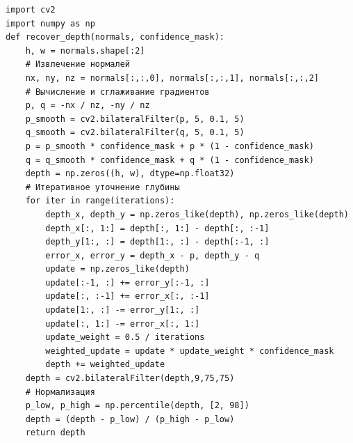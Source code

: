 \begin{center}
    \begin{lstlisting}[label=lst:depth_integration,caption=Восстановление карты глубин по нормалям]
import cv2
import numpy as np
def recover_depth(normals, confidence_mask):
    h, w = normals.shape[:2]
    # Извлечение нормалей
    nx, ny, nz = normals[:,:,0], normals[:,:,1], normals[:,:,2]
    # Вычисление и сглаживание градиентов
    p, q = -nx / nz, -ny / nz
    p_smooth = cv2.bilateralFilter(p, 5, 0.1, 5)
    q_smooth = cv2.bilateralFilter(q, 5, 0.1, 5)
    p = p_smooth * confidence_mask + p * (1 - confidence_mask)
    q = q_smooth * confidence_mask + q * (1 - confidence_mask)
    depth = np.zeros((h, w), dtype=np.float32)
    # Итеративное уточнение глубины
    for iter in range(iterations):
        depth_x, depth_y = np.zeros_like(depth), np.zeros_like(depth)
        depth_x[:, 1:] = depth[:, 1:] - depth[:, :-1]
        depth_y[1:, :] = depth[1:, :] - depth[:-1, :]
        error_x, error_y = depth_x - p, depth_y - q
        update = np.zeros_like(depth)
        update[:-1, :] += error_y[:-1, :]
        update[:, :-1] += error_x[:, :-1]
        update[1:, :] -= error_y[1:, :]
        update[:, 1:] -= error_x[:, 1:]
        update_weight = 0.5 / iterations
        weighted_update = update * update_weight * confidence_mask
        depth += weighted_update
    depth = cv2.bilateralFilter(depth,9,75,75)
    # Нормализация
    p_low, p_high = np.percentile(depth, [2, 98])
    depth = (depth - p_low) / (p_high - p_low)
    return depth
    \end{lstlisting}
\end{center}



